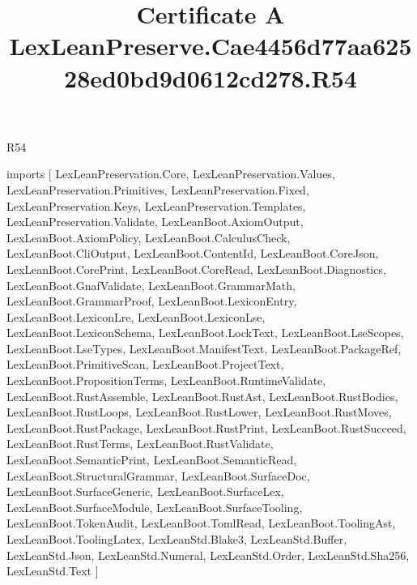 \begin{lexlean}{R54}
\title{Certificate A LexLeanPreserve.Cae4456d77aa62528ed0bd9d0612cd278.R54}
\begin{coremodule}
imports [
  LexLeanPreservation.Core,
  LexLeanPreservation.Values,
  LexLeanPreservation.Primitives,
  LexLeanPreservation.Fixed,
  LexLeanPreservation.Keys,
  LexLeanPreservation.Templates,
  LexLeanPreservation.Validate,
  LexLeanBoot.AxiomOutput,
  LexLeanBoot.AxiomPolicy,
  LexLeanBoot.CalculusCheck,
  LexLeanBoot.CliOutput,
  LexLeanBoot.ContentId,
  LexLeanBoot.CoreJson,
  LexLeanBoot.CorePrint,
  LexLeanBoot.CoreRead,
  LexLeanBoot.Diagnostics,
  LexLeanBoot.GnafValidate,
  LexLeanBoot.GrammarMath,
  LexLeanBoot.GrammarProof,
  LexLeanBoot.LexiconEntry,
  LexLeanBoot.LexiconLre,
  LexLeanBoot.LexiconLse,
  LexLeanBoot.LexiconSchema,
  LexLeanBoot.LockText,
  LexLeanBoot.LseScopes,
  LexLeanBoot.LseTypes,
  LexLeanBoot.ManifestText,
  LexLeanBoot.PackageRef,
  LexLeanBoot.PrimitiveScan,
  LexLeanBoot.ProjectText,
  LexLeanBoot.PropositionTerms,
  LexLeanBoot.RuntimeValidate,
  LexLeanBoot.RustAssemble,
  LexLeanBoot.RustAst,
  LexLeanBoot.RustBodies,
  LexLeanBoot.RustLoops,
  LexLeanBoot.RustLower,
  LexLeanBoot.RustMoves,
  LexLeanBoot.RustPackage,
  LexLeanBoot.RustPrint,
  LexLeanBoot.RustSucceed,
  LexLeanBoot.RustTerms,
  LexLeanBoot.RustValidate,
  LexLeanBoot.SemanticPrint,
  LexLeanBoot.SemanticRead,
  LexLeanBoot.StructuralGrammar,
  LexLeanBoot.SurfaceDoc,
  LexLeanBoot.SurfaceGeneric,
  LexLeanBoot.SurfaceLex,
  LexLeanBoot.SurfaceModule,
  LexLeanBoot.SurfaceTooling,
  LexLeanBoot.TokenAudit,
  LexLeanBoot.TomlRead,
  LexLeanBoot.ToolingAst,
  LexLeanBoot.ToolingLatex,
  LexLeanStd.Blake3,
  LexLeanStd.Buffer,
  LexLeanStd.Json,
  LexLeanStd.Numeral,
  LexLeanStd.Order,
  LexLeanStd.Sha256,
  LexLeanStd.Text
]


\end{coremodule}
\end{lexlean}
